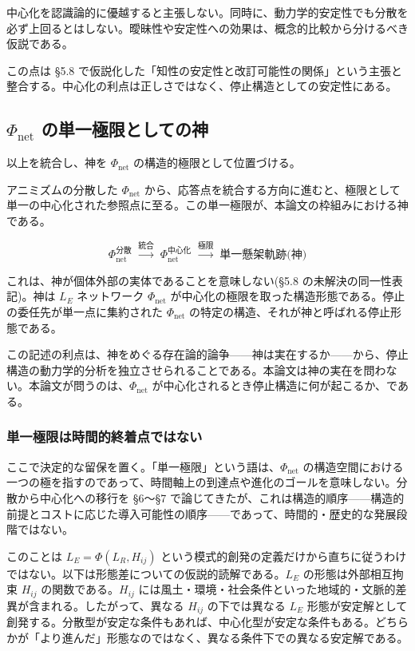 中心化を認識論的に優越すると主張しない。同時に、動力学的安定性でも分散を必ず上回るとはしない。曖昧性や安定性への効果は、概念的比較から分けるべき仮説である。

この点は \S{}5.8 で仮説化した「知性の安定性と改訂可能性の関係」という主張と整合する。中心化の利点は正しさではなく、停止構造としての安定性にある。

\bigskip


\subsection{$\Phi_{\text{net}}$ の単一極限としての神}


以上を統合し、神を $\Phi_{\text{net}}$ の構造的極限として位置づける。

アニミズムの分散した $\Phi_{\text{net}}$ から、応答点を統合する方向に進むと、極限として単一の中心化された参照点に至る。この単一極限が、本論文の枠組みにおける神である。

\[
\Phi_{\text{net}}^{\text{分散}} \;\xrightarrow{\text{統合}}\; \Phi_{\text{net}}^{\text{中心化}} \;\xrightarrow{\text{極限}}\; \text{単一懸架軌跡(神)}
\]

これは、神が個体外部の実体であることを意味しない(\S{}5.8 の未解決の同一性表記)。神は $L_E$ ネットワーク $\Phi_{\text{net}}$ が中心化の極限を取った構造形態である。停止の委任先が単一点に集約された $\Phi_{\text{net}}$ の特定の構造、それが神と呼ばれる停止形態である。

この記述の利点は、神をめぐる存在論的論争——神は実在するか——から、停止構造の動力学的分析を独立させられることである。本論文は神の実在を問わない。本論文が問うのは、$\Phi_{\text{net}}$ が中心化されるとき停止構造に何が起こるか、である。

\subsubsection{単一極限は時間的終着点ではない}


ここで決定的な留保を置く。「単一極限」という語は、$\Phi_{\text{net}}$ の構造空間における一つの極を指すのであって、時間軸上の到達点や進化のゴールを意味しない。分散から中心化への移行を \S{}6〜\S{}7 で論じてきたが、これは構造的順序——構造的前提とコストに応じた導入可能性の順序——であって、時間的・歴史的な発展段階ではない。

このことは $L_E = \Phi(L_R, H_{ij})$ という模式的創発の定義だけから直ちに従うわけではない。以下は形態差についての仮説的読解である。$L_E$ の形態は外部相互拘束 $H_{ij}$ の関数である。$H_{ij}$ には風土・環境・社会条件といった地域的・文脈的差異が含まれる。したがって、異なる $H_{ij}$ の下では異なる $L_E$ 形態が安定解として創発する。分散型が安定な条件もあれば、中心化型が安定な条件もある。どちらかが「より進んだ」形態なのではなく、異なる条件下での異なる安定解である。

